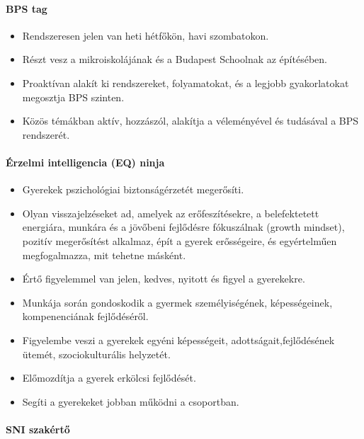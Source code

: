 \paragraph{BPS tag}

\begin{itemize}

    \item
          Rendszeresen jelen van heti hétfőkön, havi szombatokon.
    \item
          Részt vesz a mikroiskolájának és a Budapest Schoolnak az építésében.
    \item
          Proaktívan alakít ki rendszereket, folyamatokat, és a legjobb gyakorlatokat megosztja BPS szinten.
    \item
          Közös témákban aktív, hozzászól, alakítja a véleményével és tudásával a BPS rendszerét.
\end{itemize}

\paragraph{Érzelmi intelligencia (EQ) ninja}

\begin{itemize}

    \item
          Gyerekek pszichológiai biztonságérzetét megerősíti.
    \item
          Olyan visszajelzéseket ad, amelyek az erőfeszítésekre, a belefektetett energiára, munkára és a jövőbeni fejlődésre fókuszálnak (growth mindset), pozitív megerősítést alkalmaz, épít a gyerek erősségeire, és egyértelműen megfogalmazza, mit tehetne másként.
    \item
          Értő figyelemmel van jelen, kedves, nyitott és figyel a gyerekekre.
    \item Munkája során gondoskodik a gyermek személyiségének, képességeinek, kompenenciának fejlődéséről.
    \item Figyelembe veszi a gyerekek egyéni képességeit, adottságait,fejlődésének ütemét, szociokulturális helyzetét.
    \item Előmozdítja a gyerek erkölcsi fejlődését.
    \item Segíti a gyerekeket jobban működni a csoportban.

\end{itemize}

\paragraph{SNI szakértő}

